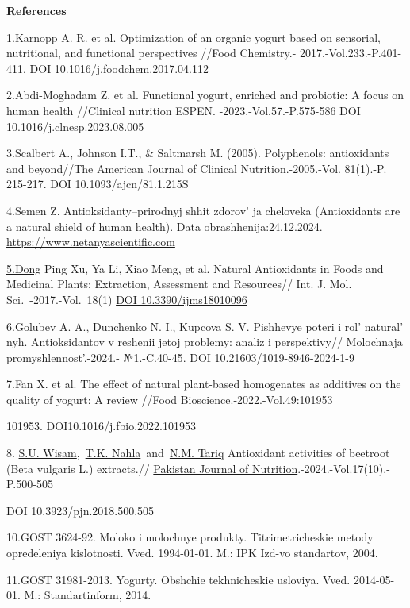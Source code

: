 \begin{center}
{\bfseries References}
\end{center}

\begin{references}
1.Karnopp A. R. et al. Optimization of an organic yogurt based on
sensorial, nutritional, and functional perspectives //Food Chemistry.-
2017.-Vol.233.-P.401-411.
DOI 10.1016/j.foodchem.2017.04.112

2.Abdi-Moghadam Z. et al. Functional yogurt, enriched and probiotic: A
focus on human health //Clinical nutrition ESPEN.
-2023.-Vol.57.-P.575-586
DOI 10.1016/j.clnesp.2023.08.005

3.Scalbert A., Johnson I.T., \& Saltmarsh M. (2005). Polyphenols:
antioxidants and beyond//The American Journal of Clinical
Nutrition.-2005.-Vol. 81(1).-P. 215-217.
DOI 10.1093/ajcn/81.1.215S

4.Semen Z. Antioksidanty--prirodnyj shhit zdorov' ja
cheloveka (Antioxidants are a natural shield of human health). Data
obrashhenija:24.12.2024.
\href{https://www.netanyascientific.com/Stati/Stati-5/data/Zlatin_Antioxidants.pdf}{https://www.netanyascientific.com}

\href{https://www.netanyascientific.com/Stati/Stati-5/data/Zlatin_Antioxidants.pdf5.Dong-5.Dong}{5.Dong}
Ping Xu, Ya Li, Xiao Meng, et al. Natural Antioxidants in Foods and
Medicinal Plants: Extraction, Assessment and Resources// Int. J. Mol.
Sci\emph{.}~-2017.-Vol.~18(1)
\href{https://doi.org/10.3390/ijms18010096}{DOI 10.3390/ijms18010096}

6.Golubev A. A., Dunchenko N. I., Kupcova S. V. Pishhevye poteri i
rol'{} natural' nyh. Antioksidantov v
reshenii jetoj problemy: analiz i perspektivy// Molochnaja
promyshlennost'.-2024.- №1.-C.40-45. DOI
10.21603/1019-8946-2024-1-9

7.Fan X. et al. The effect of natural plant-based homogenates as
additives on the quality of yogurt: A review //Food
Bioscience.-2022.-Vol.49:101953

101953. DOI10.1016/j.fbio.2022.101953

8.
\href{https://ascidatabase.com/author.php?ascicat=ALL&author=S.U.&mid=&last=Wisam}{S.U.
Wisam},~\href{https://ascidatabase.com/author.php?ascicat=ALL&author=T.K.&mid=&last=Nahla}{T.K.
Nahla}~and~\href{https://ascidatabase.com/author.php?ascicat=ALL&author=N.M.&mid=&last=Tariq}{N.M.
Tariq} Antioxidant activities of beetroot (Beta vulgaris L.) extracts.//
\href{https://www.researchgate.net/journal/Pakistan-Journal-of-Nutrition-1680-5194?_tp=eyJjb250ZXh0Ijp7ImZpcnN0UGFnZSI6InB1YmxpY2F0aW9uIiwicGFnZSI6InB1YmxpY2F0aW9uIn19}{Pakistan
Journal of Nutrition}.-2024.-Vol.17(10).-P.500-505~

DOI 10.3923/pjn.2018.500.505

10.GOST 3624-92. Moloko i molochnye produkty. Titrimetricheskie metody
opredeleniya kislotnosti. Vved. 1994-01-01. M.: IPK Izd-vo standartov,
2004.

11.GOST 31981-2013. Yogurty. Obshchie tekhnicheskie usloviya. Vved.
2014-05-01. M.: Standartinform, 2014.
\end{references}

